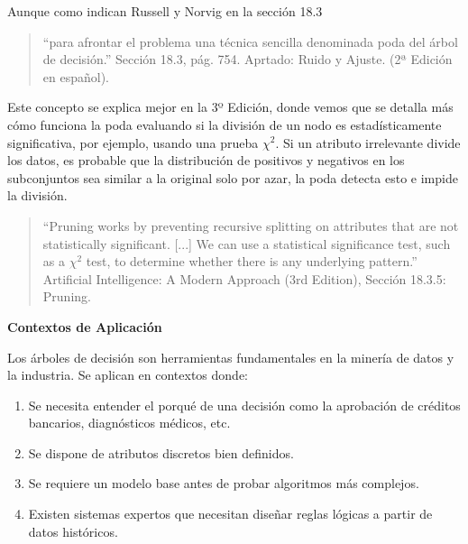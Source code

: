 \documentclass[letterpaper,12pt]{article}
\begin{document}
\begin{itemize}
\begin{itemize}
        Aunque como indican Russell y Norvig en la sección 18.3
        
        \begin{quote}
        ``para afrontar el problema una técnica sencilla denominada poda del árbol de decisión.'' Sección 18.3, pág. 754. Aprtado: Ruido y Ajuste. (2ª Edición en español).\\
        \end{quote}
        
        Este concepto se explica mejor en la 3º Edición, donde vemos que se detalla más cómo funciona la poda evaluando si la división de un nodo es estadísticamente significativa, por ejemplo, usando una prueba $\chi^{2}$. Si un atributo irrelevante divide los datos, es probable que la distribución de positivos y negativos en los subconjuntos sea similar a la original solo por azar, la poda detecta esto e impide la división.\\
        
        \begin{quote}
        ``Pruning works by preventing recursive splitting on attributes that are not statistically significant. [...] We can use a statistical significance test, such as a $\chi^{2}$ test, to determine whether there is any underlying pattern.'' Artificial Intelligence: A Modern Approach (3rd Edition), Sección 18.3.5: Pruning.\\
        \end{quote}
        
    \end{itemize}
    
    \textbf{Contextos de Aplicación}
    
    Los árboles de decisión son herramientas fundamentales en la minería de datos y la industria. Se aplican en contextos donde:
    \begin{enumerate}
        \item Se necesita entender el porqué de una decisión como la aprobación de créditos bancarios, diagnósticos médicos, etc.
        \item Se dispone de atributos discretos bien definidos.
        \item Se requiere un modelo base antes de probar algoritmos más complejos.
        \item Existen sistemas expertos que necesitan diseñar reglas lógicas a partir de datos históricos.
    \end{enumerate}
    
\end{itemize}
\end{document}
